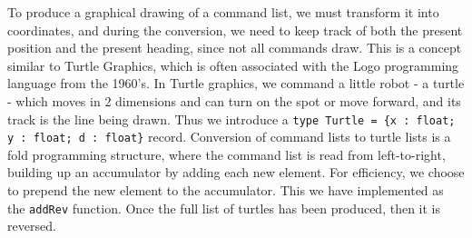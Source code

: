 \documentclass[fsharpNotes.tex]{subfiles}
\begin{document}
To produce a graphical drawing of a command list, we must transform it into coordinates, and during the conversion, we need to keep track of both the present position and the present heading, since not all commands draw. This is a concept similar to Turtle Graphics, which is often associated with the Logo programming language from the 1960's. In Turtle graphics, we command a little robot - a turtle - which moves in 2 dimensions and can turn on the spot or move forward, and its track is the line being drawn. Thus we introduce a \lstinline!type Turtle = {x : float; y : float; d : float}! record. Conversion of command lists to turtle lists is a fold programming structure, where the command list is read from left-to-right, building up an accumulator by adding each new element. For efficiency, we choose to prepend the new element to the accumulator. This we have implemented as the \lstinline{addRev} function. Once the full list of turtles has been produced, then it is reversed.
\end{document}
